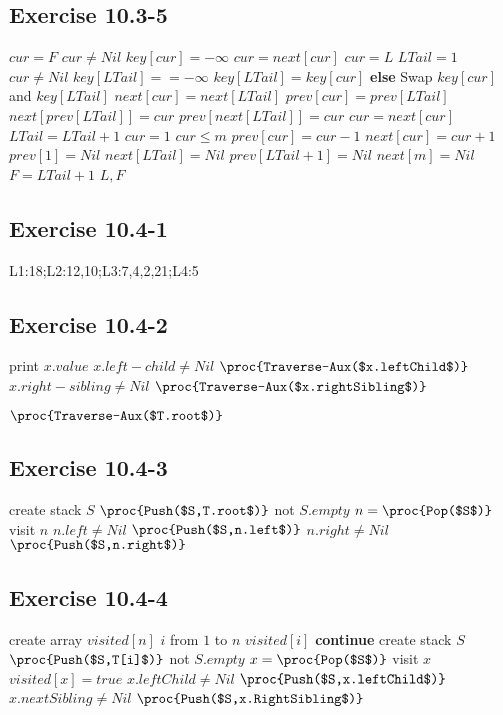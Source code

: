 \documentclass[12pt]{article}
\theoremstyle{definition}
\theoremstyle{remark}
\begin{document}
\subsection*{Exercise 10.3-5}
\begin{codebox}
\li $cur=F$
\li \While $cur\not=Nil$
\li \quad $key[cur]=-\infty$
\li \quad $cur=next[cur]$
\li $cur=L$
\li $LTail=1$
\li \While $cur\not=Nil$
\li \quad \If $key[LTail]==-\infty$
\li \qquad $key[LTail]=key[cur]$
\li \quad \textbf{else}
\li \qquad Swap $key[cur]$ and $key[LTail]$
\li \qquad $next[cur]=next[LTail]$
\li \qquad $prev[cur]=prev[LTail]$
\li \qquad $next[prev[LTail]]=cur$
\li \qquad $prev[next[LTail]]=cur$
\li \quad $cur=next[cur]$
\li \quad $LTail=LTail+1$
\li $cur=1$
\li \While $cur\le m$
\li \quad $prev[cur]=cur-1$
\li \quad $next[cur]=cur+1$
\li $prev[1]=Nil$
\li $next[LTail]=Nil$
\li $prev[LTail+1]=Nil$
\li $next[m]=Nil$
\li $F=LTail+1$
\li \Return $L,F$
\end{codebox}
\subsection*{Exercise 10.4-1}
L1:18;L2:12,10;L3:7,4,2,21;L4:5
\subsection*{Exercise 10.4-2}
\begin{codebox}
\li print $x.value$
\li \If $x.left-child\not=Nil$
\li \quad $\proc{Traverse-Aux($x.leftChild$)}$
\li \If $x.right-sibling\not=Nil$
\li \quad $\proc{Traverse-Aux($x.rightSibling$)}$
\end{codebox}
\begin{codebox}
\li $\proc{Traverse-Aux($T.root$)}$
\end{codebox}
\subsection*{Exercise 10.4-3}
\begin{codebox}
\li create stack $S$
\li $\proc{Push($S,T.root$)}$
\li \While not $S.empty$
\li \quad $n=\proc{Pop($S$)}$
\li \quad visit $n$
\li \quad \If $n.left\not=Nil$
\li \qquad $\proc{Push($S,n.left$)}$
\li \quad \If $n.right\not=Nil$
\li \qquad $\proc{Push($S,n.right$)}$
\end{codebox}
\subsection*{Exercise 10.4-4}
\begin{codebox}
\li create array $visited[n]$
\li \For $i$ from $1$ to $n$
\li \quad \If $visited[i]$
\li \qquad \textbf{continue}
\li \quad create stack $S$
\li \quad $\proc{Push($S,T[i]$)}$
\li \quad \While not $S.empty$
\li \qquad $x=\proc{Pop($S$)}$
\li \qquad visit $x$
\li \qquad $visited[x]=true$
\li \qquad \If $x.leftChild\not=Nil$
\li \quad \qquad $\proc{Push($S,x.leftChild$)}$
\li \qquad \If $x.nextSibling\not=Nil$
\li \quad \qquad $\proc{Push($S,x.RightSibling$)}$
\end{codebox}
\end{document}

